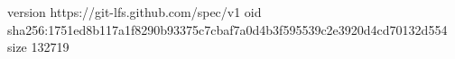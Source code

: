 version https://git-lfs.github.com/spec/v1
oid sha256:1751ed8b117a1f8290b93375c7cbaf7a0d4b3f595539c2e3920d4cd70132d554
size 132719
